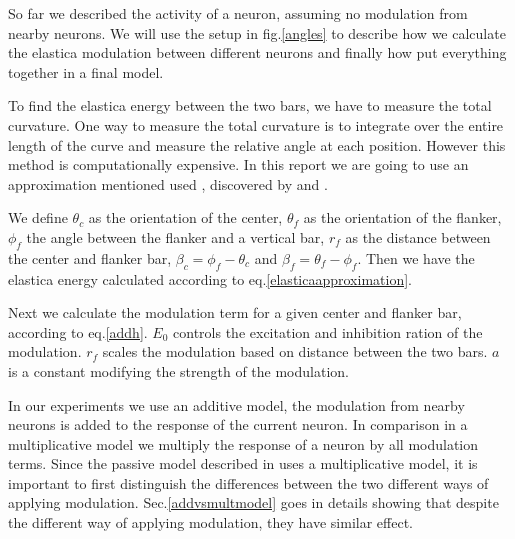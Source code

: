 So far we described the activity of a neuron, assuming no modulation from nearby neurons. We will use the setup in fig.\ref{angles} to describe how we calculate the elastica modulation between different neurons and finally how put everything together in a final model.


To find the elastica energy between the two bars, we have to measure the total curvature. One way to measure the total curvature is to integrate over the entire length of the curve and measure the relative angle at each position. However this method is computationally expensive. In this report we are going to use an approximation mentioned used \cite{keemink2015unified}, discovered by \cite{sharon2000completion} and \cite{leung1998contour}.

We define $\theta_{c}$ as the orientation of the center, $\theta_{f}$ as the orientation of the flanker, $\phi_{f}$ the angle between the flanker and a vertical bar, $r_{f}$ as the distance between the center and flanker bar, $\beta_{c}=\phi_{f}-\theta_{c}$ and $\beta_{f}=\theta_{f}-\phi_{f}$. Then we have the elastica energy calculated according to eq.\ref{elasticaapproximation}.


Next we calculate the modulation term for a given center and flanker bar, according to eq.\ref{addh}. $E_{0}$ controls the excitation and inhibition ration of the modulation. $r_{f}$ scales the modulation based on distance between the two bars. $a$ is a constant modifying the strength of the modulation.





In our experiments we use an additive model, the modulation from nearby neurons is added to the response of the current neuron. In comparison in a multiplicative model we multiply the response of a neuron by all modulation terms. Since the passive model described in \cite{keemink2015unified} uses a multiplicative model, it is important to first distinguish the differences between the two different ways of applying modulation. Sec.\ref{addvsmultmodel} goes in details showing that despite the different way of applying modulation, they have similar effect.

